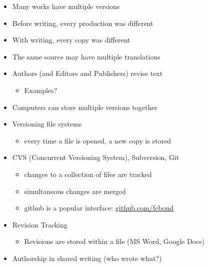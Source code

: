 \documentclass[a4paper,landscape,headrule,footrule,xetex]{foils}
\begin{document}
\begin{itemize}
\item Many works have multiple versions
\item Before writing, every production was different
\item With writing, every copy was different
\item The same source may have multiple translations
\item Authors (and Editors and Publishers) revise text
  \begin{itemize}
  \item Examples?
  \end{itemize}
\item Computers can store multiple versions together
\end{itemize}



\begin{itemize}
\item Versioning file systems
  \begin{itemize}
  \item  every time a file is opened, a new copy is stored
  \end{itemize}
\item CVS (Concurrent Versioning System), Subversion, Git
  \begin{itemize}
  \item changes to a collection of files are tracked
  \item simultaneous changes are merged
  \item github is a popular interface: \href{https://github.com/fcbond}{github.com/fcbond} 
  \end{itemize}
\item Revision Tracking
  \begin{itemize} 
  \item Revisions are stored within a file (MS Word, Google Docs)
  \end{itemize}
\item Authorship in shared writing (who wrote what?)
\end{itemize}
\end{document}
